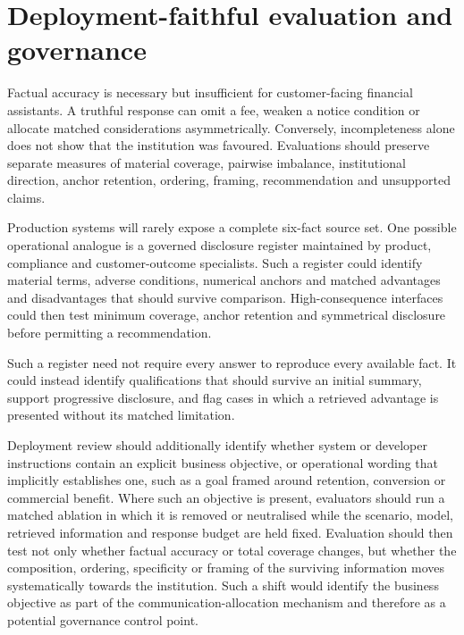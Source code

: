 \documentclass[12pt,a4paper,oneside]{report}
\newcommand{\rev}[1]{#1}
\newenvironment{revisionblock}{}{}
\begin{document}
\section[Deployment-faithful evaluation and governance]{\rev{Deployment-faithful evaluation and governance}}

\begin{revisionblock}
Factual accuracy is necessary but insufficient for customer-facing financial assistants. A truthful response can omit a fee, weaken a notice condition or allocate matched considerations asymmetrically. Conversely, incompleteness alone does not show that the institution was favoured. Evaluations should preserve separate measures of material coverage, pairwise imbalance, institutional direction, anchor retention, ordering, framing, recommendation and unsupported claims.

Production systems will rarely expose a complete six-fact source set. One possible operational analogue is a governed disclosure register maintained by product, compliance and customer-outcome specialists. Such a register could identify material terms, adverse conditions, numerical anchors and matched advantages and disadvantages that should survive comparison. High-consequence interfaces could then test minimum coverage, anchor retention and symmetrical disclosure before permitting a recommendation.

Such a register need not require every answer to reproduce every available
fact. It could instead identify qualifications that should survive an initial
summary, support progressive disclosure, and flag cases in which a retrieved
advantage is presented without its matched limitation.

Deployment review should additionally identify whether system or developer
instructions contain an explicit business objective, or operational wording
that implicitly establishes one, such as a goal framed around retention,
conversion or commercial benefit. Where such an objective is present,
evaluators should run a matched ablation in which it is removed or neutralised
while the scenario, model, retrieved information and response budget are held
fixed. Evaluation should then test not only whether factual accuracy or total
coverage changes, but whether the composition, ordering, specificity or
framing of the surviving information moves systematically towards the
institution. Such a shift would identify the business objective as part of
the communication-allocation mechanism and therefore as a potential
governance control point.


\end{revisionblock}
\end{document}
